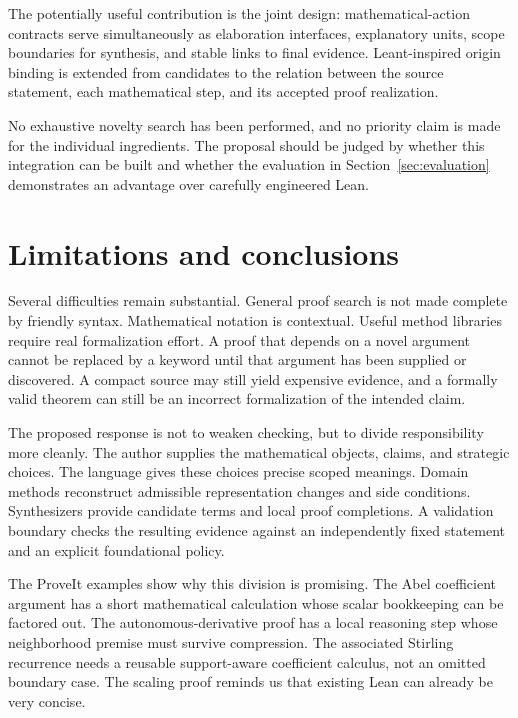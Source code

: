 \documentclass[11pt,a4paper]{article}
\theoremstyle{remark}
\begin{document}
The potentially useful contribution is the joint design: mathematical-action contracts serve simultaneously as elaboration interfaces, explanatory units, scope boundaries for synthesis, and stable links to final evidence. Leant-inspired origin binding is extended from candidates to the relation between the source statement, each mathematical step, and its accepted proof realization.

No exhaustive novelty search has been performed, and no priority claim is made for the individual ingredients. The proposal should be judged by whether this integration can be built and whether the evaluation in Section~\ref{sec:evaluation} demonstrates an advantage over carefully engineered Lean.

\section{Limitations and conclusions}
\label{sec:conclusion}

Several difficulties remain substantial. General proof search is not made complete by friendly syntax. Mathematical notation is contextual. Useful method libraries require real formalization effort. A proof that depends on a novel argument cannot be replaced by a keyword until that argument has been supplied or discovered. A compact source may still yield expensive evidence, and a formally valid theorem can still be an incorrect formalization of the intended claim.

The proposed response is not to weaken checking, but to divide responsibility more cleanly. The author supplies the mathematical objects, claims, and strategic choices. The language gives these choices precise scoped meanings. Domain methods reconstruct admissible representation changes and side conditions. Synthesizers provide candidate terms and local proof completions. A validation boundary checks the resulting evidence against an independently fixed statement and an explicit foundational policy.

The ProveIt examples show why this division is promising. The Abel coefficient argument has a short mathematical calculation whose scalar bookkeeping can be factored out. The autonomous-derivative proof has a local reasoning step whose neighborhood premise must survive compression. The associated Stirling recurrence needs a reusable support-aware coefficient calculus, not an omitted boundary case. The scaling proof reminds us that existing Lean can already be very concise.
\end{document}
